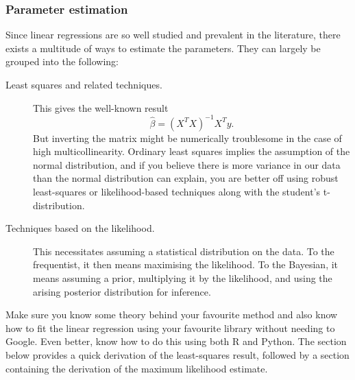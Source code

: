 \documentclass[a4paper]{article}
\begin{document}
\subsubsection{Parameter estimation}
Since linear regressions are so well studied and prevalent in the literature, there exists a multitude of ways to estimate the parameters.
They can largely be grouped into the following:
\begin{description}
  \item[Least squares and related techniques.] This gives the well-known result
  \[
    \hat{\beta} = (X^T X)^{-1}X^T y
    \text{.}
  \]
  But inverting the matrix might be numerically troublesome in the case of high multicollinearity.
  Ordinary least squares implies the assumption of the normal distribution, and if you believe there is more variance in our data than the normal distribution can explain, you are better off using robust least-squares or likelihood-based techniques along with the student's t-distribution.
  \item[Techniques based on the likelihood.]
  This necessitates assuming a statistical distribution on the data.
  To the frequentist, it then means maximising the likelihood.
  To the Bayesian, it means assuming a prior, multiplying it by the likelihood, and using the arising posterior distribution for inference.
\end{description}
Make sure you know some theory behind your favourite method and also know how to fit the linear regression using your favourite library without needing to Google.
Even better, know how to do this using both R and Python.
The section below provides a quick derivation of the least-squares result, followed by a section containing the derivation of the maximum likelihood estimate.
\end{document}
